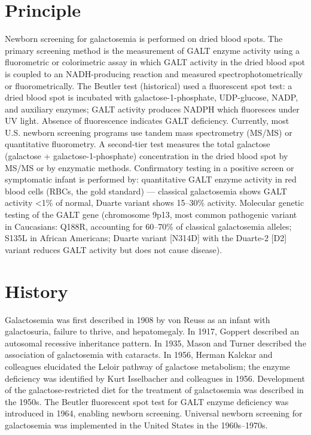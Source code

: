 \section*{Principle}
Newborn screening for galactosemia is performed on dried blood spots. The primary screening method is the measurement of GALT enzyme activity using a fluorometric or colorimetric assay in which GALT activity in the dried blood spot is coupled to an NADH-producing reaction and measured spectrophotometrically or fluorometrically. The Beutler test (historical) used a fluorescent spot test: a dried blood spot is incubated with galactose-1-phosphate, UDP-glucose, NADP, and auxiliary enzymes; GALT activity produces NADPH which fluoresces under UV light. Absence of fluorescence indicates GALT deficiency. Currently, most U.S. newborn screening programs use tandem mass spectrometry (MS/MS) or quantitative fluorometry. A second-tier test measures the total galactose (galactose + galactose-1-phosphate) concentration in the dried blood spot by MS/MS or by enzymatic methods. Confirmatory testing in a positive screen or symptomatic infant is performed by: quantitative GALT enzyme activity in red blood cells (RBCs, the gold standard) --- classical galactosemia shows GALT activity <1\% of normal, Duarte variant shows 15--30\% activity. Molecular genetic testing of the GALT gene (chromosome 9p13, most common pathogenic variant in Caucasians: Q188R, accounting for 60--70\% of classical galactosemia alleles; S135L in African Americans; Duarte variant [N314D] with the Duarte-2 [D2] variant reduces GALT activity but does not cause disease).

\section*{History}
Galactosemia was first described in 1908 by von Reuss as an infant with galactosuria, failure to thrive, and hepatomegaly. In 1917, Goppert described an autosomal recessive inheritance pattern. In 1935, Mason and Turner described the association of galactosemia with cataracts. In 1956, Herman Kalckar and colleagues elucidated the Leloir pathway of galactose metabolism; the enzyme deficiency was identified by Kurt Isselbacher and colleagues in 1956. Development of the galactose-restricted diet for the treatment of galactosemia was described in the 1950s. The Beutler fluorescent spot test for GALT enzyme deficiency was introduced in 1964, enabling newborn screening. Universal newborn screening for galactosemia was implemented in the United States in the 1960s--1970s.

